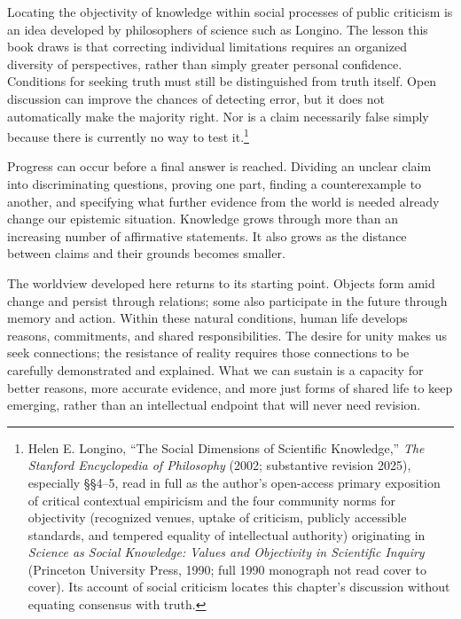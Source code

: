 \documentclass[
  english,
  11pt,
  oneside]{book}
\begin{document}
Locating the objectivity of knowledge within social processes of public criticism is an idea developed by philosophers of science such as Longino. The lesson this book draws is that correcting individual limitations requires an organized diversity of perspectives, rather than simply greater personal confidence. Conditions for seeking truth must still be distinguished from truth itself. Open discussion can improve the chances of detecting error, but it does not automatically make the majority right. Nor is a claim necessarily false simply because there is currently no way to test it.\footnote{\hypertarget{ph-note-68}{}Helen E. Longino, ``The Social Dimensions of Scientific Knowledge,'' \emph{The Stanford Encyclopedia of Philosophy} (2002; substantive revision 2025), especially §§4--5, read in full as the author's open-access primary exposition of critical contextual empiricism and the four community norms for objectivity (recognized venues, uptake of criticism, publicly accessible standards, and tempered equality of intellectual authority) originating in \emph{Science as Social Knowledge: Values and Objectivity in Scientific Inquiry} (Princeton University Press, 1990; full 1990 monograph not read cover to cover). Its account of social criticism locates this chapter's discussion without equating consensus with truth.}

Progress can occur before a final answer is reached. Dividing an unclear claim into discriminating questions, proving one part, finding a counterexample to another, and specifying what further evidence from the world is needed already change our epistemic situation. Knowledge grows through more than an increasing number of affirmative statements. It also grows as the distance between claims and their grounds becomes smaller.

\begingroup{}

The worldview developed here returns to its starting point. Objects form amid change and persist through relations; some also participate in the future through memory and action. Within these natural conditions, human life develops reasons, commitments, and shared responsibilities. The desire for unity makes us seek connections; the resistance of reality requires those connections to be carefully demonstrated and explained. What we can sustain is a capacity for better reasons, more accurate evidence, and more just forms of shared life to keep emerging, rather than an intellectual endpoint that will never need revision.

\par\endgroup
\end{document}
